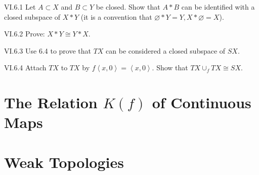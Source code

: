 \begin{problem}{VI.6.1}
Let \( A \subset X \) and \( B \subset Y \) be closed. Show that \( A \ast B \) can be identified with a closed subspace of \( X \ast Y \) (it is a convention that \( \varnothing \ast Y = Y, X \ast \varnothing = X \)).
\end{problem}

\begin{problem}{VI.6.2}
Prove: \( X \ast Y \cong Y \ast X \).
\end{problem}

\begin{problem}{VI.6.3}
Use 6.4 to prove that \( TX \) can be considered a closed subspace of \( SX \).
\end{problem}

\begin{problem}{VI.6.4}
Attach \( TX \) to \( TX \) by \( f\left\langle x, 0\right\rangle = \left\langle x, 0\right\rangle \). Show that \( TX \cup_{f} TX \cong SX \).
\end{problem}

\section{The Relation \(K(f)\) of Continuous Maps}

\section{Weak Topologies}
